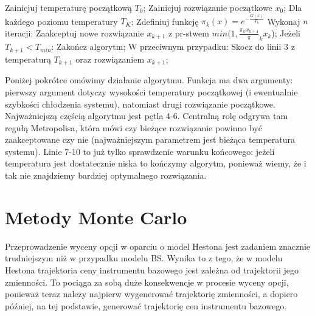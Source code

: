 \documentclass{pracamgr}
\begin{document}
{\begin{algorithm}[H]
\begin{algorithmic}[1]
  \State Zainicjuj temperaturę początkową $T_0$;
  \State Zainicjuj rozwiązanie początkowe $x_0$;
  \State Dla każdego poziomu temperatury $T_K$:
  \State  \hspace{\algorithmicindent} Zdefiniuj funkcję $\pi_k(x) = e^{- \frac{G(x)}{T_k}}$
  \State  \hspace{\algorithmicindent}    Wykonaj $n$ iteracji:
  \State    \hspace{\algorithmicindent} \hspace{\algorithmicindent}       Zaakceptuj nowe rozwiązanie $x_{k+1}$ z pr-stwem $min(1, \frac{\pi_k{x_{k+1}}}\pi_k{{x_{k}}}$);
  \State Jeżeli $T_{k+1} < T_{min}$:
  \State  \hspace{\algorithmicindent}    Zakończ algorytm;
  \State W przeciwnym przypadku:
  \State   \hspace{\algorithmicindent}   Skocz do linii 3 z temperaturą $T_{k+1}$ oraz rozwiązaniem $x_{k+1}$;

\end{algorithmic}
\label{alg:simulatedAnnealing}
\end{algorithm}


Poniżej pokrótce omówimy działanie algorytmu.
Funkcja ma dwa argumenty: pierwszy argument dotyczy wysokości temperatury początkowej (i ewentualnie
szybkości chłodzenia systemu), natomiast drugi rozwiązanie początkowe.
Najważniejszą częścią algorytmu jest pętla 4-6. 
Centralną rolę odgrywa tam regułą Metropolisa, która mówi czy bieżące rozwiązanie powinno być 
zaakceptowane czy nie (najważniejszym parametrem jest bieżąca temperatura systemu). 
Linie 7-10 to już tylko sprawdzenie warunku końcowego: jeżeli temperatura jest dostatecznie 
niska to kończymy algorytm, ponieważ wiemy, że i tak nie znajdziemy bardziej optymalnego rozwiązania.



\chapter{Metody Monte Carlo}
\label{chap:monteCarlo}

Przeprowadzenie wyceny opcji w oparciu o model Hestona jest zadaniem znacznie trudniejszym
niż w przypadku modelu BS. Wynika to z tego, że w modelu Hestona trajektoria 
ceny instrumentu bazowego jest zależna od trajektorii jego zmienności. To pociąga za sobą 
duże konsekwencje w procesie wyceny opcji, ponieważ teraz należy najpierw wygenerować trajektorię
zmienności, a dopiero później, na tej podstawie, generować trajektorię cen instrumentu bazowego.

}
\end{document}
